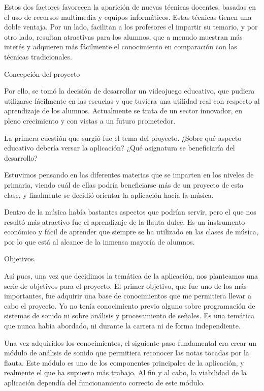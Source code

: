 \documentclass[landscape]{article}
\newenvironment{nota}
{%
\begin{framed} \noindent\itshape
}
{%
\end{framed}\vspace{-0.5cm} }
\begin{document}
\begin{multicols*}{2}
 Estos dos factores favorecen la aparición de nuevas técnicas docentes, basadas
en el uso de recursos multimedia y equipos informáticos. Estas técnicas tienen
una doble ventaja. Por un lado, facilitan a los profesores el impartir su
temario, y por otro lado, resultan atractivas para los alumnos, que a menudo
muestran más interés y adquieren más fácilmente el conocimiento en comparación
con las técnicas tradicionales.

\begin{nota}
  Concepción del proyecto
\end{nota}

Por ello, se tomó la decisión de desarrollar un videojuego educativo, que
pudiera utilizarse fácilmente en las escuelas y que tuviera una utilidad real
con respecto al aprendizaje de los alumnos. Actualmente se trata de un sector
innovador, en pleno crecimiento y con vistas a un futuro prometedor.

 La primera cuestión que surgió fue el tema del proyecto. ¿Sobre qué aspecto
educativo debería versar la aplicación? ¿Qué asignatura se beneficiaría del
desarrollo?

Estuvimos pensando en las diferentes materias que se imparten en los niveles de
primaria, viendo cuál de ellas podría beneficiarse más de un proyecto de esta
clase, y finalmente se decidió orientar la aplicación hacia la música.

 Dentro de la música había bastantes aspectos que podrían servir,
pero el que nos resultó más atractivo fue el  aprendizaje de la
flauta dulce. Es un instrumento económico y fácil de aprender que siempre se ha
utilizado en las clases de música, por lo que está al alcance de la inmensa
mayoría de alumnos.

\begin{nota}
  Objetivos.
\end{nota}

Así pues, una vez que decidimos la temática de la aplicación, nos planteamos una
serie de objetivos para el proyecto. El primer objetivo, que fue uno de los más
importantes, fue adquirir una base de conocimientos que me permitiera llevar a
cabo el proyecto. Yo no tenía conocimiento previo alguno sobre programación de
sistemas de sonido ni sobre análisis y procesamiento de señales. Es una temática
que nunca había abordado, ni durante la carrera ni de forma independiente.

Una vez adquiridos los conocimientos,  el siguiente paso
fundamental era crear un módulo de análisis de sonido que permitiera reconocer
las notas tocadas por la flauta. Este módulo es uno de los componentes
principales de la aplicación, y realmente el que ha supuesto más trabajo. Al fin
y al cabo, la viabilidad de la aplicación dependía del funcionamiento correcto
de este módulo. 


\end{multicols*}
\end{document}
